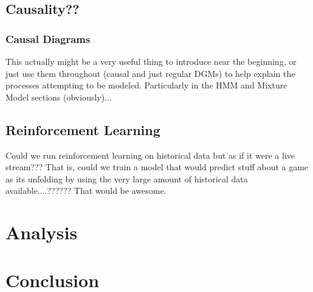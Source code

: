 \documentclass{notes}
\begin{document}
    \subsection{Causality??}
      \subsubsection{Causal Diagrams}
        This actually might be a very useful thing to introduce near the beginning, or just use them throughout (causal and just regular DGMs) to help explain the processes attempting to be modeled.
        Particularly in the HMM and Mixture Model sections (obviously)...



    \subsection{Reinforcement Learning}
      Could we run reinforcement learning on historical data but as if it were a live stream???
      That is, could we train a model that would predict stuff about a game as its unfolding by using the very large amount of historical data available....??????
      That would be awesome.

  \section{Analysis}


  \section{Conclusion}

  \pagebreak
  \renewcommand{\thesection}{\Alph{section}}
  \renewcommand{\thesubsection}{\Alph{section}.\arabic{subsection}}
  \renewcommand{\thesubsubsection}{\Alph{section}.\arabic{subsection}.\arabic{subsubsection}}
  \setcounter{section}{0}
\end{document}
